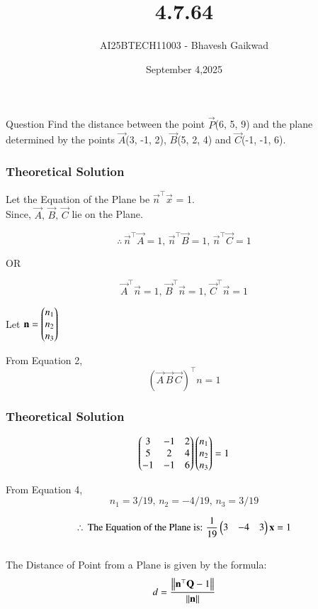 \documentclass{beamer}
\title
{4.7.64}
\date{September 4,2025}
\author 
{AI25BTECH11003 - Bhavesh Gaikwad}
\begin{document}
\frame{\titlepage}
\begin{frame}{Question}
\centering
Find the distance between the point $\vec{P}$(6, 5, 9) and the plane determined by the points $\vec{A}$(3, -1, 2), $\vec{B}$(5, 2, 4) and $\vec{C}$(-1, -1, 6).
\end{frame}


\begin{frame}[fragile]
    \frametitle{Theoretical Solution}
Let the Equation of the Plane be $\vec{n}^\top\vec{x}$ = 1.\\

Since, $\vec{A}, \, \vec{B}, \, \vec{C}$ lie on the Plane.

\begin{equation}
    \therefore \, \vec{n}^\top\vec{A}=1, \, \vec{n}^\top\vec{B}=1,  \, \vec{n}^\top\vec{C}=1
\end{equation}

\begin{center}
    OR
\end{center}

\begin{equation}
    \vec{A}^\top\vec{n}=1, \, \vec{B}^\top\vec{n}=1, \, \vec{C}^\top\vec{n}=1
\end{equation}

Let $\mathbf{n} = \begin{pmatrix}n_1 \\ n_2 \\ n_3\end{pmatrix}$

From Equation 2,
\begin{equation}
    (\vec{A} \, \vec{B} \, \vec{C})^\top n=1
\end{equation}
\end{frame}

\begin{frame}[fragile]
\frametitle{Theoretical Solution}
\begin{equation}
\begin{pmatrix}3 & -1 & 2 \\ 5 & 2 & 4\\ -1 & -1 & 6\end{pmatrix}\begin{pmatrix}n_1 \\ n_2 \\ n_3\end{pmatrix} = 1
\end{equation}


From Equation 4,
\begin{equation}
    n_1 = 3/19, \, n_2 = -4/19, \, n_3 = 3/19
\end{equation}

\begin{equation}
\therefore \, \text{The Equation of the Plane is: } \dfrac{1}{19}\begin{pmatrix}3 & -4 & 3\end{pmatrix}\mathbf{x} = 1
\end{equation}\\

The Distance of Point from a Plane is given by the formula:
\begin{equation}
    d = \dfrac{\left\lVert\mathbf{n}^\top\mathbf{Q}-1\right\rVert}{\left\lVert\mathbf{n}\right\rVert}
\end{equation}
\end{frame}
\end{document}
